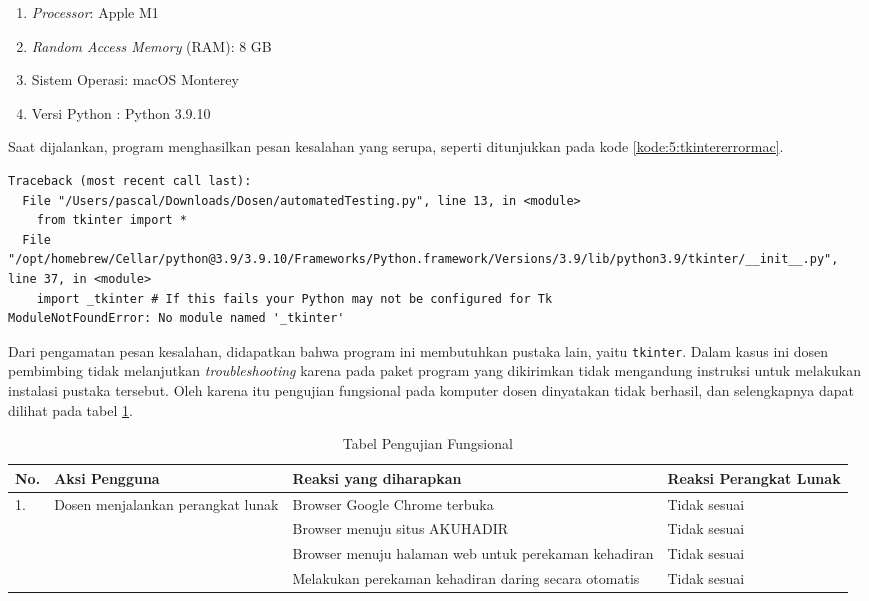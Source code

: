 \begin{enumerate}
	\item \textit{Processor}: Apple M1
	\item \textit{Random Access Memory} (RAM): 8 GB
	\item Sistem Operasi: macOS Monterey
	\item Versi Python : Python 3.9.10
\end{enumerate}

Saat dijalankan, program menghasilkan pesan kesalahan yang serupa, seperti ditunjukkan pada kode \ref{kode:5:tkintererrormac}.

\begin{lstlisting}[caption=Pesan kesalahan program tanpa \textit{tkinter} pada komputer alternatif, label=kode:5:tkintererrormac]
 % python3 automatedTesting.py
Traceback (most recent call last):
  File "/Users/pascal/Downloads/Dosen/automatedTesting.py", line 13, in <module>
    from tkinter import * 
  File "/opt/homebrew/Cellar/python@3.9/3.9.10/Frameworks/Python.framework/Versions/3.9/lib/python3.9/tkinter/__init__.py", line 37, in <module>
    import _tkinter # If this fails your Python may not be configured for Tk
ModuleNotFoundError: No module named '_tkinter'
\end{lstlisting}

Dari pengamatan pesan kesalahan, didapatkan bahwa program ini membutuhkan pustaka lain, yaitu \texttt{tkinter}. Dalam kasus ini dosen pembimbing tidak melanjutkan \textit{troubleshooting} karena pada paket program yang dikirimkan tidak mengandung instruksi untuk melakukan instalasi pustaka tersebut. Oleh karena itu pengujian fungsional pada komputer dosen dinyatakan tidak berhasil, dan selengkapnya dapat dilihat pada tabel \ref{tab:fungsidosen}.

\begin{table}[H]			
	\caption{Tabel Pengujian Fungsional}
	\centering
	\begin{tabular}{|p{0.5cm} |p{4cm} |p{5.5cm}| p{3cm}|} \hline
		No. & Aksi Pengguna & Reaksi yang diharapkan & Reaksi Perangkat Lunak\\ \hline     
		1. & Dosen menjalankan perangkat lunak & Browser Google Chrome terbuka & Tidak sesuai\\ \hline 
		 	& &  Browser menuju situs AKUHADIR & Tidak sesuai\\ \hline
		 	& &  Browser menuju halaman web untuk perekaman kehadiran & Tidak sesuai\\ \hline
		 	& &  Melakukan perekaman kehadiran daring secara otomatis & Tidak sesuai\\ \hline
	\end{tabular}
	\label{tab:fungsidosen}
\end{table}

